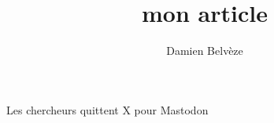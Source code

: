 \documentclass[12pt]{article}
\author{Damien Belvèze}
\title{mon article}
\begin{document}
\maketitle

Les chercheurs quittent X pour Mastodon \cite{claveyMastodonRefugePour2023}
\end{document}
